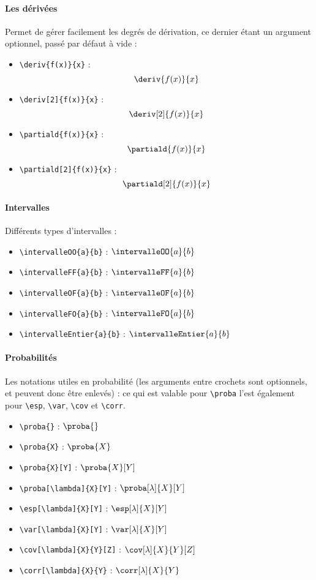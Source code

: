 \paragraph{Les dérivées} Permet de gérer facilement les degrés de dérivation, ce dernier étant un argument optionnel, passé par défaut à vide :
\begin{itemize}
    \item \verb=\deriv{f(x)}{x}= : $$\deriv{f(x)}{x}$$
    \item \verb=\deriv[2]{f(x)}{x}= : $$\deriv[2]{f(x)}{x}$$
    \item \verb=\partiald{f(x)}{x}= : $$\partiald{f(x)}{x}$$
    \item \verb=\partiald[2]{f(x)}{x}= : $$\partiald[2]{f(x)}{x}$$
\end{itemize}

\paragraph{Intervalles} Différents types d'intervalles :
\begin{itemize}
    \item \verb=\intervalleOO{a}{b}= : $\intervalleOO{a}{b}$
    \item \verb=\intervalleFF{a}{b}= : $\intervalleFF{a}{b}$
    \item \verb=\intervalleOF{a}{b}= : $\intervalleOF{a}{b}$
    \item \verb=\intervalleFO{a}{b}= : $\intervalleFO{a}{b}$
    \item \verb=\intervalleEntier{a}{b}= : $\intervalleEntier{a}{b}$
\end{itemize}

\paragraph{Probabilités} Les notations utiles en probabilité (les arguments entre crochets sont optionnels, et peuvent donc être enlevés) : ce qui est valable pour \verb=\proba= l'est également pour \verb=\esp=, \verb=\var=, \verb=\cov= et \verb=\corr=.
\begin{itemize}
    \item \verb=\proba{}= : $\proba{}$
    \item \verb=\proba{X}= : $\proba{X}$
    \item \verb=\proba{X}[Y]= : $\proba{X}[Y]$
    \item \verb=\proba[\lambda]{X}[Y]= : $\proba[\lambda]{X}[Y]$
    \item \verb=\esp[\lambda]{X}[Y]= : $\esp[\lambda]{X}[Y]$
    \item \verb=\var[\lambda]{X}[Y]= : $\var[\lambda]{X}[Y]$
    \item \verb=\cov[\lambda]{X}{Y}[Z]= : $\cov[\lambda]{X}{Y}[Z]$
    \item \verb=\corr[\lambda]{X}{Y}= : $\corr[\lambda]{X}{Y}$
\end{itemize}

